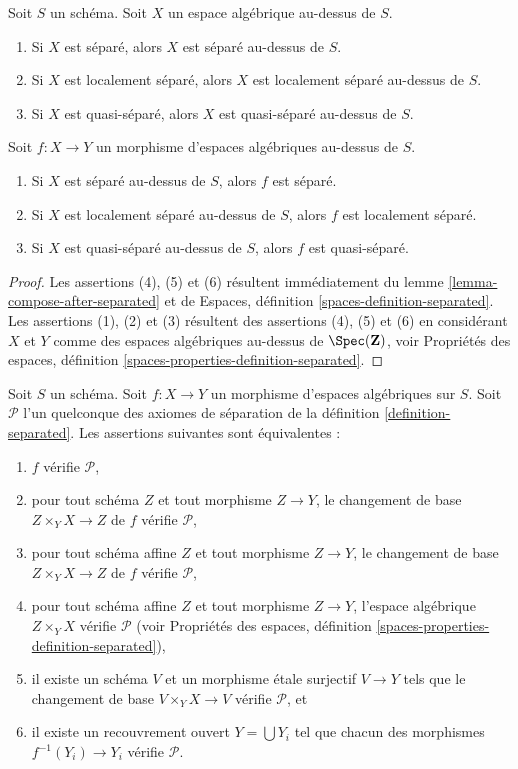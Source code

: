 \begin{lemma}
\label{lemma-separated-implies-morphism-separated}
Soit $S$ un schéma. Soit $X$ un espace algébrique au-dessus de $S$.
\begin{enumerate}
\item Si $X$ est séparé, alors $X$ est séparé au-dessus de $S$.
\item Si $X$ est localement séparé, alors $X$ est localement séparé au-dessus de $S$.
\item Si $X$ est quasi-séparé, alors $X$ est quasi-séparé au-dessus de $S$.
\end{enumerate}
Soit $f : X \to Y$ un morphisme d'espaces algébriques au-dessus de $S$.
\begin{enumerate}
\item[(4)] Si $X$ est séparé au-dessus de $S$, alors $f$ est séparé.
\item[(5)] Si $X$ est localement séparé au-dessus de $S$, alors $f$ est localement séparé.
\item[(6)] Si $X$ est quasi-séparé au-dessus de $S$, alors $f$ est quasi-séparé.
\end{enumerate}
\end{lemma}

\begin{proof}
Les assertions (4), (5) et (6) résultent immédiatement du
lemme \ref{lemma-compose-after-separated}
et de
Espaces, définition \ref{spaces-definition-separated}.
Les assertions (1), (2) et (3) résultent des assertions (4), (5) et (6) en
considérant $X$ et $Y$ comme des espaces algébriques au-dessus de
$\Spec(\mathbf{Z})$, voir
Propriétés des espaces, définition \ref{spaces-properties-definition-separated}.
\end{proof}

\begin{lemma}
\label{lemma-separated-local}
Soit $S$ un schéma.
Soit $f : X \to Y$ un morphisme d'espaces algébriques sur $S$.
Soit $\mathcal{P}$ l'un quelconque des axiomes de
séparation de la définition \ref{definition-separated}.
Les assertions suivantes sont équivalentes :
\begin{enumerate}
\item $f$ vérifie $\mathcal{P}$,
\item pour tout schéma $Z$ et tout morphisme $Z \to Y$, le
changement de base $Z \times_Y X \to Z$ de $f$ vérifie $\mathcal{P}$,
\item pour tout schéma affine $Z$ et tout morphisme $Z \to Y$, le
changement de base $Z \times_Y X \to Z$ de $f$ vérifie $\mathcal{P}$,
\item pour tout schéma affine $Z$ et tout morphisme $Z \to Y$,
l'espace algébrique $Z \times_Y X$ vérifie $\mathcal{P}$ (voir
Propriétés des espaces, définition \ref{spaces-properties-definition-separated}),
\item il existe un schéma $V$ et un morphisme \'etale surjectif
$V \to Y$ tels que le changement de base $V \times_Y X \to V$ vérifie
$\mathcal{P}$, et
\item il existe un recouvrement ouvert $Y = \bigcup Y_i$ tel que chacun
des morphismes $f^{-1}(Y_i) \to Y_i$ vérifie $\mathcal{P}$.
\end{enumerate}
\end{lemma}

